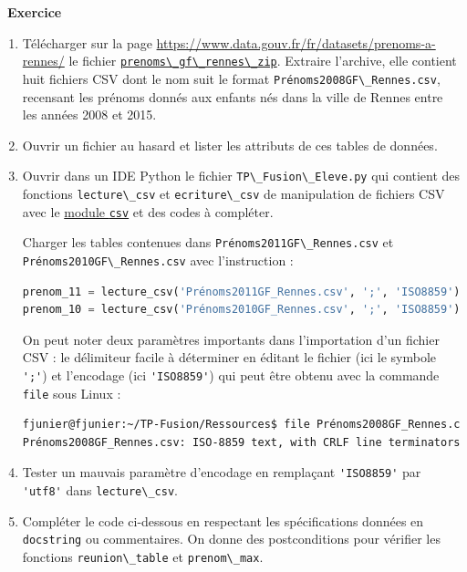 \documentclass[
  11pt,
]{article}
\newcommand{\passthrough}[1]{#1}
\newcounter{exo}
\newenvironment{exercice}[1]
{\par \medskip   \addtocounter{exo}{1} \noindent  
\begin{bclogo}[arrondi =0.1,   noborder = true, logo=\bccrayon, marge=4]{~\textbf{Exercice} \textbf{\theexo} {\itshape #1} }  \par}
{
\end{bclogo}
 \par \bigskip }
\newcounter{def}
\begin{document}
\begin{exercice}{}

\begin{enumerate}
\def\labelenumi{\arabic{enumi}.}
\item
  Télécharger sur la page
  \url{https://www.data.gouv.fr/fr/datasets/prenoms-a-rennes/} le
  fichier
  \href{https://www.data.gouv.fr/fr/datasets/r/4b1b72d6-7238-4bda-a5de-ebd72cb058a0}{\passthrough{\lstinline!prenoms\_gf\_rennes\_zip!}}.
  Extraire l'archive, elle contient huit fichiers CSV dont le nom suit
  le format \passthrough{\lstinline!Prénoms2008GF\_Rennes.csv!},
  recensant les prénoms donnés aux enfants nés dans la ville de Rennes
  entre les années 2008 et 2015.
\item
  Ouvrir un fichier au hasard et lister les attributs de ces tables de
  données.
\item
  Ouvrir dans un IDE Python le fichier
  \passthrough{\lstinline!TP\_Fusion\_Eleve.py!} qui contient des
  fonctions \passthrough{\lstinline!lecture\_csv!} et
  \passthrough{\lstinline!ecriture\_csv!} de manipulation de fichiers
  CSV avec le
  \href{https://docs.python.org/fr/3/library/csv.html}{module
  \passthrough{\lstinline!csv!}} et des codes à compléter.

  Charger les tables contenues dans
  \passthrough{\lstinline!Prénoms2011GF\_Rennes.csv!} et
  \passthrough{\lstinline!Prénoms2010GF\_Rennes.csv!} avec l'instruction
  :

\begin{lstlisting}[language=Python]
prenom_11 = lecture_csv('Prénoms2011GF_Rennes.csv', ';', 'ISO8859')
prenom_10 = lecture_csv('Prénoms2010GF_Rennes.csv', ';', 'ISO8859')
\end{lstlisting}

  On peut noter deux paramètres importants dans l'importation d'un
  fichier CSV : le délimiteur facile à déterminer en éditant le fichier
  (ici le symbole \passthrough{\lstinline!';'!}) et l'encodage (ici
  \passthrough{\lstinline!'ISO8859'!}) qui peut être obtenu avec la
  commande \passthrough{\lstinline!file!} sous Linux :

\begin{lstlisting}[language=bash]
fjunier@fjunier:~/TP-Fusion/Ressources$ file Prénoms2008GF_Rennes.csv 
Prénoms2008GF_Rennes.csv: ISO-8859 text, with CRLF line terminators
\end{lstlisting}
\item
  Tester un mauvais paramètre d'encodage en remplaçant
  \passthrough{\lstinline!'ISO8859'!} par
  \passthrough{\lstinline!'utf8'!} dans
  \passthrough{\lstinline!lecture\_csv!}.
\item
  Compléter le code ci-dessous en respectant les spécifications données
  en \passthrough{\lstinline!docstring!} ou commentaires. On donne des
  postconditions pour vérifier les fonctions
  \passthrough{\lstinline!reunion\_table!} et
  \passthrough{\lstinline!prenom\_max!}.


\end{enumerate}
\end{exercice}
\end{document}
